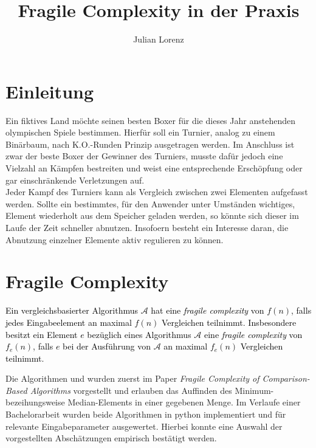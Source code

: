 \documentclass[a1,portrait]{a0poster}
\author{Julian Lorenz}
\title{Fragile Complexity in der Praxis}
\begin{document}
\begin{multicols}{2}

\section{Einleitung}
\noindent
Ein fiktives Land möchte seinen besten Boxer für die dieses Jahr anstehenden olympischen Spiele bestimmen.
Hierfür soll ein Turnier, analog zu einem Binärbaum, nach K.O.-Runden Prinzip ausgetragen werden. Im Anschluss
ist zwar der beste Boxer der Gewinner des Turniers, musste dafür jedoch eine Vielzahl an Kämpfen bestreiten und
weist eine entsprechende Erschöpfung oder gar einschränkende Verletzungen auf.\\[.1cm]
Jeder Kampf des Turniers kann als Vergleich zwischen zwei Elementen aufgefasst werden. 
Sollte ein bestimmtes, für den Anwender unter Umständen wichtiges, Element wiederholt aus dem Speicher geladen 
werden, so könnte sich dieser im Laufe der Zeit schneller abnutzen. Insofoern besteht ein Interesse daran, 
die Abnutzung einzelner Elemente aktiv regulieren zu können. 


\vfill\null
\columnbreak


\section{Fragile Complexity}
\noindent
\vspace{-1.42cm}
\textcolor{goetheblau}{
\begin{definition*}
    \textcolor{black}{
    Ein vergleichsbasierter Algorithmus $\mathcal{A}$ hat eine \textit{fragile complexity} von $f(n)$, falls jedes Eingabeelement an maximal $f(n)$ Vergleichen teilnimmt. Insbesondere besitzt ein Element $e$ bezüglich eines Algorithmus $\mathcal{A}$ eine \textit{fragile complexity} von $f_e(n)$, falls $e$ bei der Ausführung von $\mathcal{A}$ an maximal $f_e(n)$ Vergleichen teilnimmt.}
\end{definition*}
}
\vspace*{0.1cm}

\noindent
Die Algorithmen \Rm und \RM wurden zuerst im Paper 
\textit{Fragile Complexity of Comparison-Based Algorithms} vorgestellt und erlauben 
das Auffinden des Minimum- bezeihungsweise Median-Elements in einer gegebenen Menge. 
Im Verlaufe einer Bachelorarbeit wurden beide Algorithmen in python implementiert 
und für relevante Eingabeparameter ausgewertet. Hierbei konnte eine Auswahl 
der vorgestellten Abschätzungen empirisch bestätigt werden.
\end{multicols}
\end{document}
